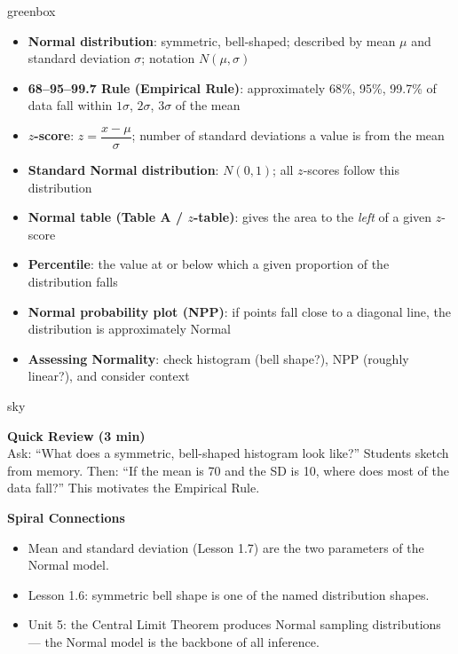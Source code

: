 \documentclass[10pt]{article}
\begin{document}
\begin{skillbox}{greenbox}
\begin{minipage}[t]{0.48\linewidth}
    \begin{itemize}
        \item \textbf{Normal distribution}: symmetric, bell-shaped; described by mean $\mu$ and standard deviation $\sigma$; notation $N(\mu, \sigma)$
        \item \textbf{68--95--99.7 Rule (Empirical Rule)}: approximately 68\%, 95\%, 99.7\% of data fall within $1\sigma$, $2\sigma$, $3\sigma$ of the mean
        \item \textbf{$z$-score}: $z = \dfrac{x - \mu}{\sigma}$; number of standard deviations a value is from the mean
        \item \textbf{Standard Normal distribution}: $N(0, 1)$; all $z$-scores follow this distribution
    \end{itemize}
\end{minipage}
\hfill
\begin{minipage}[t]{0.48\linewidth}
    \begin{itemize}
        \item \textbf{Normal table (Table A / $z$-table)}: gives the area to the \textit{left} of a given $z$-score
        \item \textbf{Percentile}: the value at or below which a given proportion of the distribution falls
        \item \textbf{Normal probability plot (NPP)}: if points fall close to a diagonal line, the distribution is approximately Normal
        \item \textbf{Assessing Normality}: check histogram (bell shape?), NPP (roughly linear?), and consider context
    \end{itemize}
\end{minipage}
\end{skillbox}

\begin{skillbox}{sky}
\begin{minipage}[t]{0.48\linewidth}
    \textbf{Quick Review (3 min)}\\
    Ask: ``What does a symmetric, bell-shaped histogram look like?'' Students sketch from memory. Then: ``If the mean is 70 and the SD is 10, where does most of the data fall?'' This motivates the Empirical Rule.
\end{minipage}
\hfill
\begin{minipage}[t]{0.48\linewidth}
    \textbf{Spiral Connections}
    \begin{itemize}
        \item Mean and standard deviation (Lesson 1.7) are the two parameters of the Normal model.
        \item Lesson 1.6: symmetric bell shape is one of the named distribution shapes.
        \item Unit 5: the Central Limit Theorem produces Normal sampling distributions --- the Normal model is the backbone of all inference.
    \end{itemize}
\end{minipage}
\end{skillbox}
\end{document}
